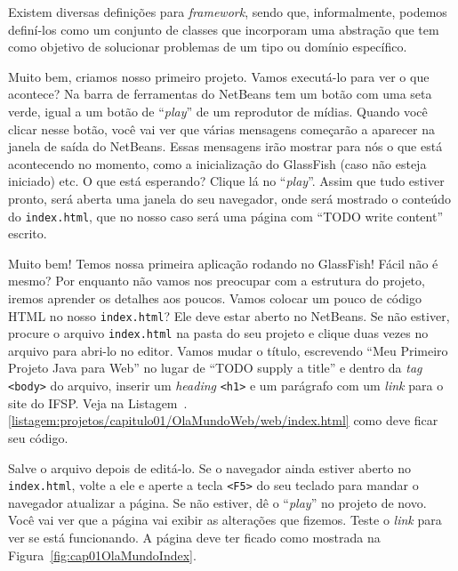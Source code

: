 \begin{saibaMais}
    Existem diversas definições para \textit{framework}, sendo que, informalmente, podemos definí-los como um conjunto de classes que incorporam uma abstração que tem como objetivo de solucionar problemas de um tipo ou domínio específico.
\end{saibaMais}

Muito bem, criamos nosso primeiro projeto. Vamos executá-lo para ver o que acontece? Na barra de ferramentas do NetBeans tem um botão com uma seta verde, igual a um botão de ``\textit{play}'' de um reprodutor de mídias. Quando você clicar nesse botão, você vai ver que várias mensagens começarão a aparecer na janela de saída do NetBeans. Essas mensagens irão mostrar para nós o que está acontecendo no momento, como a inicialização do GlassFish (caso não esteja iniciado) etc. O que está esperando? Clique lá no ``\textit{play}''. Assim que tudo estiver pronto, será aberta uma janela do seu navegador, onde será mostrado o conteúdo do \texttt{index.html}, que no nosso caso será uma página com ``TODO write content'' escrito.

Muito bem! Temos nossa primeira aplicação rodando no GlassFish! Fácil não é mesmo? Por enquanto não vamos nos preocupar com a estrutura do projeto, iremos aprender os detalhes aos poucos. Vamos colocar um pouco de código HTML no nosso \texttt{index.html}? Ele deve estar aberto no NetBeans. Se não estiver, procure o arquivo \texttt{index.html} na pasta  do seu projeto e clique duas vezes no arquivo para abri-lo no editor. Vamos mudar o título, escrevendo ``Meu Primeiro Projeto Java para Web'' no lugar de ``TODO supply a title'' e dentro da \textit{tag} \texttt{<body>} do arquivo, inserir um \textit{heading} \texttt{<h1>} e um parágrafo com um \textit{link} para o site do IFSP. Veja na Listagem~\thechapter.\ref{listagem:projetos/capitulo01/OlaMundoWeb/web/index.html} como deve ficar seu código.


Salve o arquivo depois de editá-lo. Se o navegador ainda estiver aberto no \texttt{index.html}, volte a ele e aperte a tecla \texttt{<F5>} do seu teclado para mandar o navegador atualizar a página. Se não estiver, dê o ``\textit{play}'' no projeto de novo. Você vai ver que a página vai exibir as alterações que fizemos. Teste o \textit{link} para ver se está funcionando. A página deve ter ficado como mostrada na Figura~\ref{fig:cap01OlaMundoIndex}.

